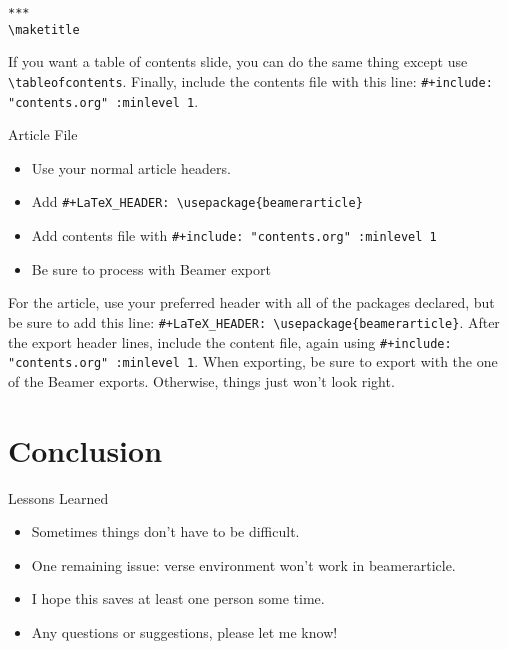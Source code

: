 \documentclass[aspectratio=169,12pt,ignorenonframetext]{beamer}
\begin{document}
\begin{verbatim}
***
\maketitle
\end{verbatim}


If you want a table of contents slide, you can do the same thing except use \texttt{\textbackslash{}tableofcontents}. Finally, include the contents file with this line: \texttt{\#+include: "contents.org" :minlevel 1}.


\begin{frame}[label={sec:org035abe7},fragile]{Article File}
 \begin{itemize}
\item Use your normal article headers.
\item Add \texttt{\#+LaTeX\_HEADER: \textbackslash{}usepackage\{beamerarticle\}}
\item Add contents file with \texttt{\#+include: "contents.org" :minlevel 1}
\item Be sure to process with Beamer export
\end{itemize}
\end{frame}

For the article, use your preferred header with all of the packages declared, but be sure to add this line: \texttt{\#+LaTeX\_HEADER: \textbackslash{}usepackage\{beamerarticle\}}. After the export header lines, include the content file, again using \texttt{\#+include: "contents.org" :minlevel 1}. When exporting, be sure to export with the one of the Beamer exports. Otherwise, things just won't look right.

\section{Conclusion}
\label{sec:orgdb83846}



\begin{frame}[label={sec:org2e17964}]{Lessons Learned}
\begin{itemize}
\item Sometimes things don't have to be difficult.
\item One remaining issue: verse environment won't work in beamerarticle.
\item I hope this saves at least one person some time.
\item Any questions or suggestions, please let me know!
\end{itemize}
\end{frame}
\end{document}
